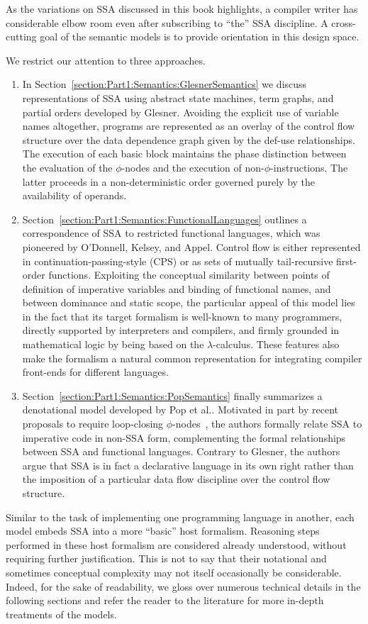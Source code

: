 As the variations on SSA discussed in this book highlights, a compiler
writer has considerable elbow room even after subscribing to ``the''
SSA discipline. A cross-cutting goal of the semantic models is to
provide orientation in this design space.

We restrict our attention to three
approaches.
\begin{enumerate}
\item In Section~\ref{section:Part1:Semantics:GlesnerSemantics} we discuss representations of SSA using abstract state machines, term graphs, and partial orders developed
  by Glesner. Avoiding the explicit use of variable names altogether,
  programs are represented as an overlay of the control flow structure
  over the data dependence graph given by the def-use
  relationships. The execution of each basic block maintains the phase
  distinction between the evaluation of the $\phi$-nodes and the
  execution of non-$\phi$-instructions. The latter proceeds in a
  non-deterministic order governed purely by the availability of
  operands.
\item Section~\ref{section:Part1:Semantics:FunctionalLanguages} outlines a correspondence of SSA to restricted functional languages, which was
  pioneered by O'Donnell, Kelsey, and Appel. Control flow is either
  represented in continuation-passing-style (CPS) or as sets of
  mutually tail-recursive first-order functions. Exploiting the
  conceptual similarity between points of definition of imperative
  variables and binding of functional names, and between dominance and
  static scope, the particular appeal of this model lies in the fact
  that its target formalism is well-known to many programmers,
  directly supported by interpreters and compilers, and firmly
  grounded in mathematical logic by being based on the
  $\lambda$-calculus. These features also make the formalism a natural
  common representation for integrating compiler front-ends for
  different languages.
\item Section~\ref{section:Part1:Semantics:PopSemantics} finally summarizes a denotational model developed by Pop et al.. Motivated in part by recent proposals to require loop-closing $\phi$-nodes~\cite{}, the authors formally relate SSA to imperative code in non-SSA form, complementing the formal relationships between SSA and functional languages. Contrary to Glesner, the authors argue that SSA is in fact a declarative language in its own right rather than the imposition of a particular data flow discipline over the control flow structure. 
\end{enumerate}
Similar to the task of implementing one programming language in
another, each model embeds SSA into a more ``basic'' host
formalism. Reasoning steps performed in these host formalism are
considered already understood, without requiring further
justification.  This is not to say that their notational and sometimes
conceptual complexity may not itself occasionally be
considerable. Indeed, for the sake of readability, we gloss over
numerous technical details in the following sections and refer the
reader to the literature for more in-depth treatments of the models.

